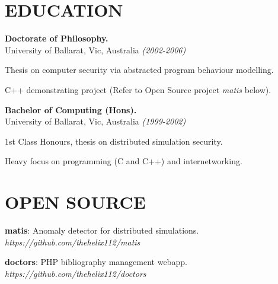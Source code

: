 \documentclass[margin]{res}
\begin{document}
\begin{resume}




\section{EDUCATION}

{\bf Doctorate of Philosophy.} \\
University of Ballarat, Vic, Australia {\em (2002-2006)}
\begin{list}{}{\leftmargin=1.5em \topsep=5pt \partopsep=0pt \parsep=2.5pt}
  \item Thesis on computer security via abstracted program behaviour modelling.
  \item C++ demonstrating project (Refer to Open Source project {\em
    matis} below).
\end{list}

{\bf Bachelor of Computing (Hons).} \\
University of Ballarat, Vic, Australia {\em (1999-2002)}
\begin{list}{}{\leftmargin=1.5em \topsep=5pt \partopsep=0pt \parsep=2.5pt}
  \item 1st Class Honours, thesis on distributed simulation security.
  \item Heavy focus on programming (C and C++) and internetworking.
\end{list}


\section{OPEN SOURCE}
\begin{list}{}{\leftmargin=0em \topsep=0pt \partopsep=0pt \parsep=2.5pt}
\item {\bf matis}: Anomaly detector for distributed simulations.  {\em https://github.com/thehelix112/matis}
\item {\bf doctors}: PHP bibliography management webapp.  {\em https://github.com/thehelix112/doctors}
\end{list}


\end{resume}
\end{document}
